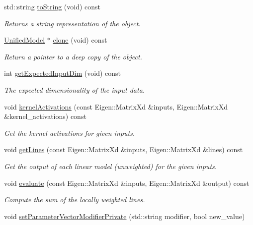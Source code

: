 \begin{DoxyCompactItemize}
std\+::string \hyperlink{classDmpBbo_1_1UnifiedModel_a1aca816b42cf0d36118be0ab91120d77}{to\+String} (void) const 
\begin{DoxyCompactList}\small\item\em Returns a string representation of the object. \end{DoxyCompactList}\item 
\hyperlink{classDmpBbo_1_1UnifiedModel}{Unified\+Model} $\ast$ \hyperlink{classDmpBbo_1_1UnifiedModel_aaf24473bfe62ff5d8665379c9b2bb0e0}{clone} (void) const 
\begin{DoxyCompactList}\small\item\em Return a pointer to a deep copy of the object. \end{DoxyCompactList}\item 
int \hyperlink{classDmpBbo_1_1UnifiedModel_af5a550bcf65d5a29a153a594cc4e3fa1}{get\+Expected\+Input\+Dim} (void) const 
\begin{DoxyCompactList}\small\item\em The expected dimensionality of the input data. \end{DoxyCompactList}\item 
void \hyperlink{classDmpBbo_1_1UnifiedModel_a125cc60559b55f7348beb15f25834b6f}{kernel\+Activations} (const Eigen\+::\+Matrix\+Xd \&inputs, Eigen\+::\+Matrix\+Xd \&kernel\+\_\+activations) const 
\begin{DoxyCompactList}\small\item\em Get the kernel activations for given inputs. \end{DoxyCompactList}\item 
void \hyperlink{classDmpBbo_1_1UnifiedModel_ae8174f3d5e718d18c587c9bd50dc333f}{get\+Lines} (const Eigen\+::\+Matrix\+Xd \&inputs, Eigen\+::\+Matrix\+Xd \&lines) const 
\begin{DoxyCompactList}\small\item\em Get the output of each linear model (unweighted) for the given inputs. \end{DoxyCompactList}\item 
void \hyperlink{classDmpBbo_1_1UnifiedModel_a7f75b15a5b46d4efa1974290cab4b901}{evaluate} (const Eigen\+::\+Matrix\+Xd \&inputs, Eigen\+::\+Matrix\+Xd \&output) const 
\begin{DoxyCompactList}\small\item\em Compute the sum of the locally weighted lines. \end{DoxyCompactList}\item 
void \hyperlink{classDmpBbo_1_1UnifiedModel_add0186ca30d91928b887805fe0d24598}{set\+Parameter\+Vector\+Modifier\+Private} (std\+::string modifier, bool new\+\_\+value)

\end{DoxyCompactItemize}
